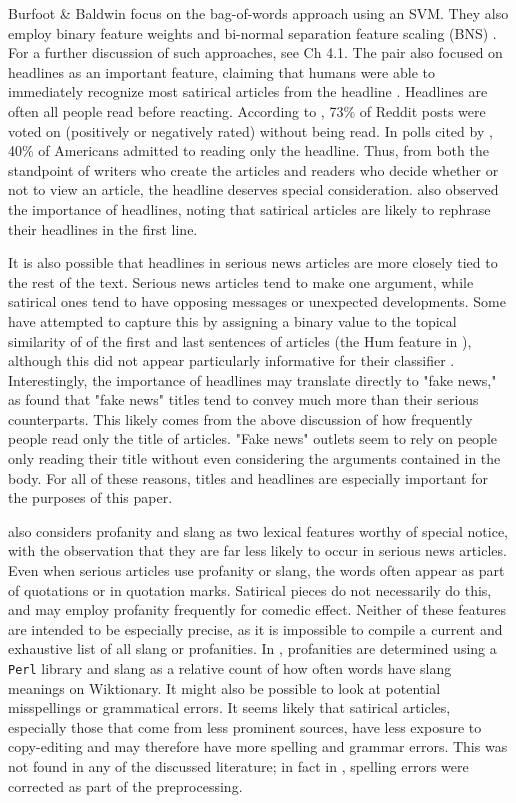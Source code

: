\documentclass [12 pt] {report}
\begin{document}
Burfoot \& Baldwin focus on the bag-of-words approach using an SVM. They also employ binary feature weights and bi-normal separation feature scaling (BNS) \cite{Burfoot}. For a further discussion of such approaches, see Ch 4.1. The pair also focused on headlines as an important feature, claiming that humans were able to immediately recognize most satirical articles from the headline \cite{Burfoot}. Headlines are often all people read before reacting. According to \cite{title}, 73\% of Reddit posts were voted on (positively or negatively rated) without being read. In polls cited by \cite{fakeNews}, 40\% of Americans admitted to reading only the headline. Thus, from both the standpoint of writers who create the articles and readers who decide whether or not to view an article, the headline deserves special consideration. \cite{fakeNews} also observed the importance of headlines, noting that satirical articles are likely to rephrase their headlines in the first line.
	
It is also possible that headlines in serious news articles are more closely tied to the rest of the text. Serious news articles tend to make one argument, while satirical ones tend to have opposing messages or unexpected developments. Some have attempted to capture this by assigning a binary value to the topical similarity of of the first and last sentences of articles (the Hum feature in \cite{fakeNews}), although this did not appear particularly informative for their classifier \cite{fakeNews}. Interestingly, the importance of headlines may translate directly to "fake news," as \cite{Horne} found that "fake news" titles tend to convey much more than their serious counterparts. This likely comes from the above discussion of how frequently people read only the title of articles. "Fake news" outlets seem to rely on people only reading their title without even considering the arguments contained in the body. For all of these reasons, titles and headlines are especially important for the purposes of this paper.
	
\cite{Burfoot} also considers profanity and slang as two lexical features worthy of special notice, with the observation that they are far less likely to occur in serious news articles. Even when serious articles use profanity or slang, the words often appear as part of quotations or in quotation marks. Satirical pieces do not necessarily do this, and may employ profanity frequently for comedic effect. Neither of these features are intended to be especially precise, as it is impossible to compile a current and exhaustive list of all slang or profanities. In \cite{Burfoot}, profanities are determined using a \texttt{Perl} library and slang as a relative count of how often words have slang meanings on Wiktionary. It might also be possible to look at potential misspellings or grammatical errors. It seems likely that satirical articles, especially those that come from less prominent sources, have less exposure to copy-editing and may therefore have more spelling and grammar errors. This was not found in any of the discussed literature; in fact in \cite{Twitter}, spelling errors were corrected as part of the preprocessing.
	
\end{document}

